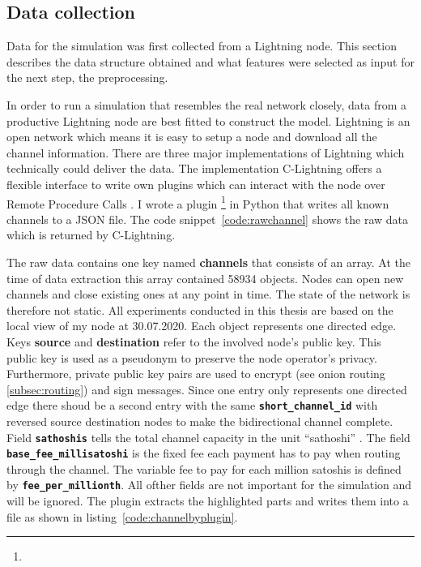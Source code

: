 \documentclass[final]{fhnwreport}       %
\begin{document}
\subsection{Data collection}\label{subsec:datacol}
Data for the simulation was first collected from a Lightning node. This section describes the data structure obtained and what features were selected as input for the next step, the preprocessing. 

In order to run a simulation that resembles the real network closely, data from a productive Lightning node are best fitted to construct the model. Lightning is an open network which means it is easy to setup a node and download all the channel information. There are three major implementations of Lightning which technically could deliver the data. The implementation C-Lightning offers a flexible interface to write own plugins which can interact with the node over Remote Procedure Calls . I wrote a plugin \footnote{\gitpluginurl} in Python that writes all known channels to a JSON file. The code snippet~\ref{code:rawchannel} shows the raw data which is returned by C-Lightning. 


The raw data contains one key named \textbf{channels} that consists of an array. At the time of data extraction this array contained 58934 objects. Nodes can open new channels and close existing ones at any point in time. The state of the network is therefore not static. All experiments conducted in this thesis are based on the local view of my node at 30.07.2020. Each object represents one directed edge. Keys \textbf{source} and \textbf{destination} refer to the involved node's public key. This public key is used as a pseudonym to preserve the node operator's privacy. Furthermore, private public key pairs are used to encrypt (see onion routing \ref{subsec:routing}) and sign messages. Since one entry only represents one directed edge there shoud be a second entry with the same \textbf{\texttt{short\_channel\_id}} with reversed source destination nodes to make the bidirectional channel complete. Field \textbf{\texttt{sathoshis}} tells the total channel capacity in the unit ``sathoshi'' . The field \textbf{\texttt{base\_fee\_millisatoshi}} is the fixed fee each payment has to pay when routing through the channel. The variable fee to pay for each million satoshis is defined by \textbf{\texttt{fee\_per\_millionth}}. All ofther fields are not important for the simulation and will be ignored. The plugin extracts the highlighted parts and writes them into a file as shown in listing~\ref{code:channelbyplugin}. 
\end{document}
